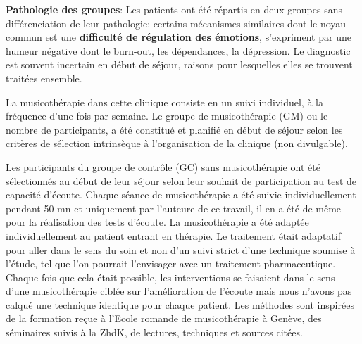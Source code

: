  
 \textbf{ Pathologie des groupes}: Les patients ont été répartis en deux groupes sans différenciation de
 leur pathologie:   
 certains mécanismes
 similaires dont le
 noyau commun est une
 \textbf{difficulté de
 	régulation des
 	émotions},
 s'expriment  par une
 humeur négative dont le burn-out, les dépendances, la dépression.
 Le diagnostic est souvent incertain en début de séjour, raisons pour lesquelles elles
 se trouvent traitées ensemble.
 
 La musicothérapie dans cette clinique consiste en un suivi individuel, à la fréquence d'une fois par 
 semaine.
   Le groupe de musicothérapie (GM) ou le nombre de participants, a été  constitué  et planifié en début 
   de séjour selon les critères de sélection 
   intrinsèque à  l'organisation de la clinique (non divulgable).
  
  Les participants du groupe de contrôle (GC) sans musicothérapie  ont été sélectionnés au début 
  de leur séjour selon leur souhait de participation au test de capacité d'écoute.
Chaque séance de musicothérapie a été suivie individuellement pendant 50 mn et uniquement par 
 l'auteure de ce 
 travail,%
  il en a été de même pour la réalisation des tests d'écoute.
  La musicothérapie a été adaptée individuellement au patient entrant en thérapie. Le traitement était 
   adaptatif pour aller dans le sens du soin et non d'un suivi strict d'une technique soumise à l'étude, tel 
   que l'on pourrait 
   l'envisager avec un traitement  pharmaceutique.
 Chaque fois que  cela était possible, les interventions se faisaient dans le sens d'une musicothérapie 
 ciblée sur l'amélioration de l'écoute mais nous n'avons pas calqué une technique identique pour chaque 
 patient.
  Les méthodes sont inspirées de la formation reçue à l'Ecole 
 romande de 
 musicothérapie à Genève, des séminaires suivis à la ZhdK, de lectures, techniques  et sources citées. 
 

